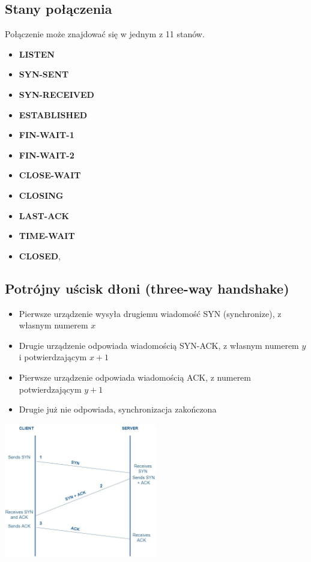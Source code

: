 \documentclass[]{article}
\begin{document}
\subsection{Stany połączenia}
Połączenie może znajdować się w jednym z 11 stanów. 
\begin{multicols}{2}
\begin{itemize}
    \item \textbf{LISTEN}
    \item \textbf{SYN-SENT}
    \item \textbf{SYN-RECEIVED}
    \item \textbf{ESTABLISHED}
    \item \textbf{FIN-WAIT-1}
    \item \textbf{FIN-WAIT-2}
    \item \textbf{CLOSE-WAIT}
    \item \textbf{CLOSING}
    \item \textbf{LAST-ACK}
    \item \textbf{TIME-WAIT}
    \item \textbf{CLOSED},
\end{itemize}
\end{multicols}
\subsection{Potrójny uścisk dłoni (three-way handshake)}
\label{handshake}
\begin{itemize}
    \item Pierwsze urządzenie wysyła drugiemu wiadomość SYN (synchronize), z własnym numerem $x$
    \item Drugie urządzenie odpowiada wiadomością SYN-ACK, z własnym numerem $y$ i potwierdzającym $x+1$
    \item Pierwsze urządzenie odpowiada wiadomością ACK, z numerem potwierdzającym $y+1$
    \item Drugie już nie odpowiada, synchronizacja zakończona
\end{itemize}
\begin{center}
    \includegraphics[width=0.5\textwidth]{handshake.jpg}
\end{center}
\end{document}
